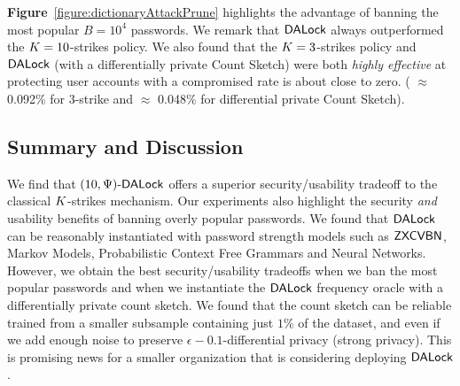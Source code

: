 \textbf{Figure}~\ref{figure:dictionaryAttackPrune} highlights the advantage of banning the most popular $B=10^4$ passwords. We remark that $\mathsf{DALock}$ always outperformed the $K=10$-strikes policy. We also found that the $K=3$-strikes policy and $\mathsf{DALock}$ (with a differentially private Count Sketch) were both {\em highly effective} at protecting user accounts with a compromised rate is about close to zero. ( $\approx$ 0.092\% for 3-strike and  $\approx$ 0.048\% for differential private Count Sketch).

\subsection{Summary and Discussion}\label{sec:experiment_summary}
We find that $(10, \Psi)\text{-}\mathsf{DALock}$ offers a superior security/usability tradeoff to the classical $K$-strikes mechanism. Our experiments also highlight the security {\em and} usability benefits of banning overly popular passwords. We found that $\mathsf{DALock}$ can be reasonably instantiated with password strength models such as $\mathsf{ZXCVBN}$, Markov Models, Probabilistic Context Free Grammars and Neural Networks. However, we obtain the best security/usability tradeoffs when we ban the most popular passwords and when we instantiate the $\mathsf{DALock}$ frequency oracle    with a differentially private count sketch. We found that the count sketch can be reliable trained from a smaller subsample containing just $1\%$ of the dataset, and even if we add enough noise to preserve $\epsilon-0.1$-differential privacy (strong privacy). This is promising news for a smaller organization that is considering deploying $\mathsf{DALock}$.



